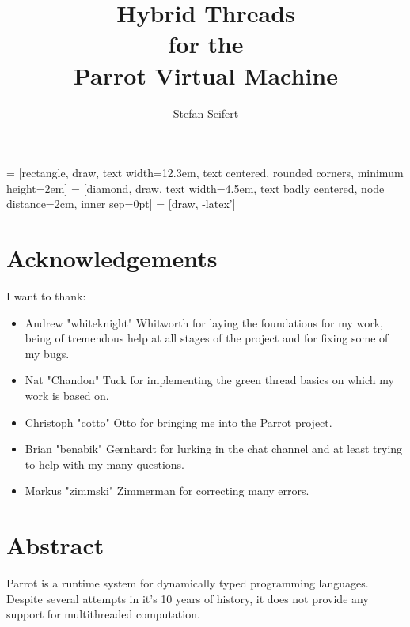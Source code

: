 \documentclass[bachelor,english]{hgbthesis}
\begin{document}
 = [rectangle, draw, text width=12.3em, text centered, rounded corners, minimum height=2em]
 = [diamond, draw, text width=4.5em, text badly centered, node distance=2cm, inner sep=0pt]
 = [draw, -latex']

\title{Hybrid Threads \\ for the \\ Parrot Virtual Machine}

\author{Stefan Seifert}


\frontmatter
\maketitle
\tableofcontents

\chapter{Acknowledgements}

I want to thank:
\begin{itemize}
\item{Andrew "whiteknight" Whitworth for laying the foundations for my work, being of tremendous help at all stages of the project and for fixing some of my bugs.}
\item{Nat "Chandon" Tuck for implementing the green thread basics on which my work is based on.}
\item{Christoph "cotto" Otto for bringing me into the Parrot project.}
\item{Brian "benabik" Gernhardt for lurking in the chat channel and at least trying to help with my many questions.}
\item{Markus "zimmski" Zimmerman for correcting many errors.}
\end{itemize}

\chapter{Abstract}

Parrot is a runtime system for dynamically typed programming languages. Despite several attempts in it's 10 years of history, it does not provide any support for multithreaded computation.
\end{document}
